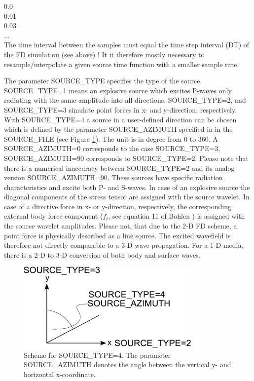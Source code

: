 \documentclass[11pt,onecolumn,oneside]{article}
\begin{document}
0.0\\
0.01\\
0.03\\
...\\

The time interval between the samples must equal the time step interval (DT) of the FD simulation (see above) ! It it therefore mostly necessary to resample/interpolate a given source time function with a smaller sample rate. 

The parameter SOURCE\_TYPE specifies the type of the source. SOURCE\_TYPE=1 means an explosive source which excites P-waves only radiating with the same amplitude into all directions. SOURCE\_TYPE=2, and SOURCE\_TYPE=3 simulate point forces in x- and y-direction, respectively. With  SOURCE\_TYPE=4 a source in a user-defined direction can be chosen which is defined by the parameter SOURCE\_AZIMUTH specified in in the SOURCE\_FILE (see Figure \ref{fig_source_azimuth}). The unit is in degree from 0 to 360. A SOURCE\_AZIMUTH=0 corresponds to the case SOURCE\_TYPE=3, SOURCE\_AZIMUTH=90  corresponds to SOURCE\_TYPE=2. Please note that there is a numerical inaccuracy between SOURCE\_TYPE=2 and its analog version SOURCE\_AZIMUTH=90. These sources have specific radiation characteristics and excite both P- and S-waves. In case of an explosive source the diagonal components of the stress tensor are assigned with the source wavelet. In case of a directive force in x- or y-direction, respectively, the corresponding external body force component ($f_i$, see equation 11 of Bohlen ) is assigned with the source wavelet amplitudes. Please not, that due to the 2-D FD scheme, a point force is physically described as a line source. The excited wavefield is therefore not directly comparable to a 3-D wave propagation. For a 1-D media, there is a 2-D to 3-D conversion of both body and surface waves.

\begin{figure}
\begin{center}
\includegraphics[width=9cm,angle=0]{figures/source_azimuth.pdf}
\end{center}
\caption{Scheme for SOURCE\_TYPE=4. The parameter SOURCE\_AZIMUTH denotes the angle between the vertical y- and horizontal x-coordinate.}
\label{fig_source_azimuth}
\end{figure}
\end{document}
